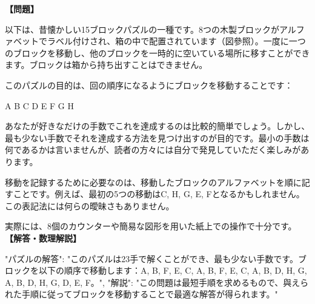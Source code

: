 \documentclass[10pt,a4paper,oneside,openany]{ltjsbook}
\begin{document}
\begin{tcolorbox}[colback=softblue,colframe=primaryblue,title=\textbf{第 219 問：THE LETTER BLOCK PUZZLE.},arc=2mm,boxrule=1pt,breakable]
\textbf{【問題】}\par\vspace{0.3em}
以下は、昔懐かしい15ブロックパズルの一種です。8つの木製ブロックがアルファベットでラベル付けされ、箱の中で配置されています（図參照）。一度に一つのブロックを移動し、他のブロックを一時的に空いている場所に移すことができます。ブロックは箱から持ち出すことはできません。

このパズルの目的は、回の順序になるようにブロックを移動することです：

    A   B   C
    D   E   F
    G   H

あなたが好きなだけの手数でこれを達成するのは比較的簡単でしょう。しかし、最も少ない手数でそれを達成する方法を見つけ出すのが目的です。最小の手数は何であるかは言いませんが、読者の方々には自分で発見していただく楽しみがあります。

移動を記録するために必要なのは、移動したブロックのアルファベットを順に記すことです。例えば、最初の5つの移動はC, H, G, E, Fとなるかもしれません。この表記法には何らの曖昧さもありません。

実際には、8個のカウンターや簡易な図形を用いた紙上での操作で十分です。
\tcblower
\textbf{【解答・数理解説】}\par\vspace{0.3em}
{
"パズルの解答": "このパズルは23手で解くことができ、最も少ない手数です。ブロックを以下の順序で移動します：A, B, F, E, C, A, B, F, E, C, A, B, D, H, G, A, B, D, H, G, D, E, F。",
"解説": "この問題は最短手順を求めるもので、與えられた手順に従ってブロックを移動することで最適な解答が得られます。"
}
\end{tcolorbox}
\end{document}
